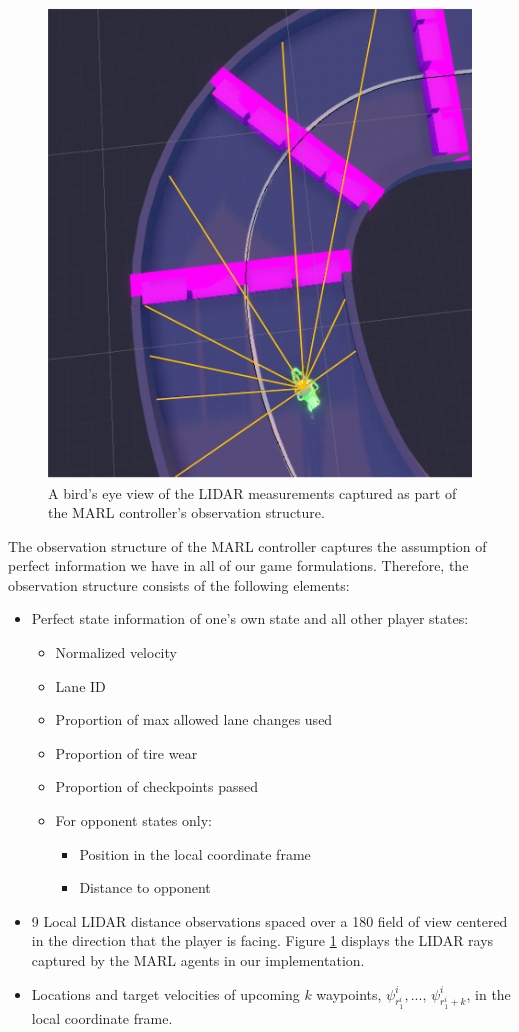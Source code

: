 \begin{figure}
  \centering
  \includegraphics[height=0.5\textwidth, angle=270]{Figures/AgentLidar.png}
  \caption[LIDAR observations of MARL-based agents.] {A bird's eye view of the LIDAR measurements captured as part of the MARL controller's observation structure.}
  \label{fig:lidar}
\end{figure}

The observation structure of the MARL controller captures the assumption of perfect information we have in all of our game formulations. Therefore, the observation structure consists of the following elements:
\begin{itemize}
    \item Perfect state information of one's own state and all other player states:
    \begin{itemize}
        \item Normalized velocity
        \item Lane ID
        \item Proportion of max allowed lane changes used
        \item Proportion of tire wear
        \item Proportion of checkpoints passed
        \item For opponent states only: 
        \begin{itemize}
            \item Position in the local coordinate frame
            \item Distance to opponent
        \end{itemize}
        \end{itemize}
    \item 9 Local LIDAR distance observations spaced over a 180\textdegree{} field of view centered in the direction that the player is facing. Figure \ref{fig:lidar} displays the LIDAR rays captured by the MARL agents in our implementation.
    \item Locations and target velocities of upcoming $k$ waypoints, $\psi^i_{r^i_{1}}, ..., \, \psi^i_{r^i_{1} + k}$, in the local coordinate frame. 
\end{itemize}


